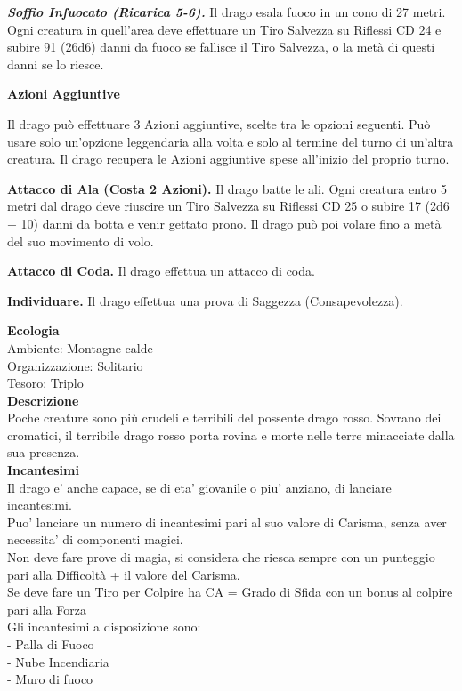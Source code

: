 \begin{multicols}{2}
\emph{\textbf{Soffio Infuocato (Ricarica 5-6).}} Il drago esala fuoco in un cono di 27 metri. Ogni creatura in quell'area deve effettuare un Tiro Salvezza su Riflessi CD 24 e subire 91 (26d6) danni da fuoco se fallisce il Tiro Salvezza, o la metà di questi danni se lo riesce.

\textbf{Azioni Aggiuntive}

Il drago può effettuare 3 Azioni aggiuntive, scelte tra le opzioni seguenti. Può usare solo un'opzione leggendaria alla volta e solo al termine del turno di un'altra creatura. Il drago recupera le Azioni aggiuntive spese all'inizio del proprio turno.

\textbf{Attacco di Ala (Costa 2 Azioni).} Il drago batte le ali. Ogni creatura entro 5 metri dal drago deve riuscire un Tiro Salvezza su Riflessi CD 25 o subire 17 (2d6 + 10) danni da botta e venir gettato prono. Il drago può poi volare fino a metà del suo movimento di volo.

\textbf{Attacco di Coda.} Il drago effettua un attacco di coda.

\textbf{Individuare.} Il drago effettua una prova di Saggezza (Consapevolezza).

\textbf{Ecologia}\\
Ambiente: Montagne calde\\
Organizzazione: Solitario\\
Tesoro: Triplo\\
\textbf{Descrizione}\\
Poche creature sono più crudeli e terribili del possente drago rosso. Sovrano dei cromatici, il terribile drago rosso porta rovina e morte nelle terre minacciate dalla sua presenza.\\
\textbf{Incantesimi}\\
Il drago e' anche capace, se di eta' giovanile o piu' anziano, di lanciare incantesimi.\\
Puo' lanciare un numero di incantesimi pari al suo valore di Carisma, senza aver necessita' di componenti magici.\\
Non deve fare prove di magia, si considera che riesca sempre con un punteggio pari alla Difficoltà + il valore del Carisma.\\
Se deve fare un Tiro per Colpire ha CA = Grado di Sfida con un bonus al colpire pari alla Forza\\
Gli incantesimi a disposizione sono:\\
- Palla di Fuoco\\
- Nube Incendiaria\\
- Muro di fuoco\\



\end{multicols}
